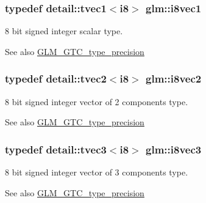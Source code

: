 \subsubsection[{i8vec1}]{\setlength{\rightskip}{0pt plus 5cm}typedef detail\+::tvec1$<$i8$>$ {\bf glm\+::i8vec1}}\label{group__gtc__type__precision_ga7d8b7cc439e81d9deef1477dcbe4bd0b}
8 bit signed integer scalar type. \begin{DoxySeeAlso}{See also}
\hyperlink{group__gtc__type__precision}{G\+L\+M\+\_\+\+G\+T\+C\+\_\+type\+\_\+precision} 
\end{DoxySeeAlso}
\hypertarget{group__gtc__type__precision_ga4d5ac02b48c4c6e1642ae89f9d3f3c7e}{}
\subsubsection[{i8vec2}]{\setlength{\rightskip}{0pt plus 5cm}typedef detail\+::tvec2$<$i8$>$ {\bf glm\+::i8vec2}}\label{group__gtc__type__precision_ga4d5ac02b48c4c6e1642ae89f9d3f3c7e}
8 bit signed integer vector of 2 components type. \begin{DoxySeeAlso}{See also}
\hyperlink{group__gtc__type__precision}{G\+L\+M\+\_\+\+G\+T\+C\+\_\+type\+\_\+precision} 
\end{DoxySeeAlso}
\hypertarget{group__gtc__type__precision_gafd1d80c392c472fc14864ebd8c9316e9}{}
\subsubsection[{i8vec3}]{\setlength{\rightskip}{0pt plus 5cm}typedef detail\+::tvec3$<$i8$>$ {\bf glm\+::i8vec3}}\label{group__gtc__type__precision_gafd1d80c392c472fc14864ebd8c9316e9}
8 bit signed integer vector of 3 components type. \begin{DoxySeeAlso}{See also}
\hyperlink{group__gtc__type__precision}{G\+L\+M\+\_\+\+G\+T\+C\+\_\+type\+\_\+precision} 
\end{DoxySeeAlso}
\hypertarget{group__gtc__type__precision_gad65f6cda14cdf79b2e8afe6ec8ab3725}{}
